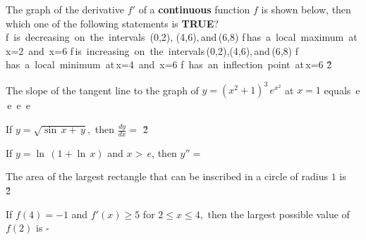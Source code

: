 \documentclass[amsfonts,bezier,leqno,fleqn,12pt,a4paper]{article}
\begin{document}
{{{{\begin{large}
\newpage



\item %
The graph of the derivative $f'$ of a \textbf{continuous} function $f$ is shown below, then which one of the following statements is \textbf{TRUE}?\\[0.5in]
\sc
\be
f\, \mbox{is decreasing on the intervals}\, (0,2), (4,6),\,\mbox{and}\,(6,8)
\ee
\be
f\,\mbox{has a local maximum at}\,x=2 \,\mbox{and}\, x=6
\ee
\be
f\,\mbox{is increasing on the intervals}\,(0,2),(4,6),\,\mbox{and}\,(6,8)
\ee
\be
f\, \mbox{has a local minimum at}\,x=4 \,\mbox{and}\, x=6
\ee
\be
f\, \mbox{has an inflection point at}\,x=6
\ee
\v2



\item %
The slope of the tangent line to the graph of $y=(x^2+1)^3\,e^{x^2}$ at $x=1$ equals
\sc
{}\,e
\ee
{}\,e
\ee
{}\,e
\ee
{}\,e
\ee
{}
\ee

\newpage



\item %
If $y=\sqrt{\sin \,x+\,y},$ then $\displaystyle \frac{dy}{dx}=$
\sc
\be
\displaystyle {}
\ee
\be
\displaystyle {}
\ee
\be
\displaystyle {}
\ee
\be
\displaystyle {}
\ee
\be
\displaystyle {}
\ee
\v2



\item %
If $\displaystyle y=\ln\,(1+\ln\,x)$ and $x>\,e$, then $y''=$
\sc
\be
\displaystyle {}
\ee
\be
\displaystyle {}
\ee
\be
\displaystyle {}
\ee
\be
\displaystyle {}
\ee
\be
\displaystyle {}
\ee

\newpage



\item %
The area of the largest rectangle that can be inscribed in a circle of radius $1$ is
\sc
\be
\displaystyle {}
\ee
{}
\ee
{}\,\pi
\ee
\be
{}\,
\ee
{}
\ee
\v2



\item %
If $f(4)=-1$ and $f'(x)\geq 5$ for $2\leq x \leq 4,$ then the largest possible value of $f(2)$ is
\sc
{}
\ee
{}
\ee
{}
\ee
{}
\ee
\be
\displaystyle -
\ee


\end{large}}}}}
\end{document}
